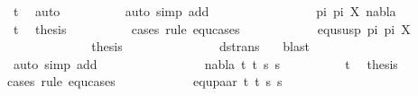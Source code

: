 \begin{isabellebody}
\ t{}{}\ \isamarkupfalse%
\ auto\isanewline
\ \ \ \ \ \ \ \ \isamarkupfalse%
\ {\isacharparenleft}{\kern0pt}auto\ simp\ add{\isacharcolon}{\kern0pt}\ {}{\isacharparenright}{\kern0pt}\isanewline
\ \ \ \ \ \isamarkupfalse%
\isanewline
\ \ \ \ \ \ \ \isamarkupfalse%
\ {\isacharparenleft}{\kern0pt}{}\ pi{}\ pi{}\ X\ nabla{\isacharparenright}{\kern0pt}\isanewline
\ \ \ \ \ \ \ \ \isamarkupfalse%
\ t{}{}\ \isamarkupfalse%
\ {\isacharquery}{\kern0pt}thesis\ \isanewline
\ \ \ \ \ \ \ \ \isamarkupfalse%
{\isacharparenleft}{\kern0pt}cases\ rule{\isacharcolon}{\kern0pt}\ equ{\isachardot}{\kern0pt}cases{\isacharparenright}{\kern0pt}\isanewline
\ \ \ \ \ \ \ \ \ \ \isamarkupfalse%
\ {\isacharparenleft}{\kern0pt}equ{\isacharunderscore}{\kern0pt}susp\ pi{}\ pi{}\ X{\isacharparenright}{\kern0pt}\isanewline
\ \ \ \ \ \ \ \ \ \ \isamarkupfalse%
\ \isamarkupfalse%
\ {\isacharquery}{\kern0pt}thesis\ \isanewline
\ \ \ \ \ \ \ \ \ \ \ \ \isamarkupfalse%
\ ds{\isacharunderscore}{\kern0pt}trans\ {}\ \isamarkupfalse%
\ blast\isanewline
\ \ \ \ \ \ \ \ \isamarkupfalse%
\ {\isacharparenleft}{\kern0pt}auto\ simp\ add{\isacharcolon}{\kern0pt}\ {}{\isacharparenright}{\kern0pt}\isanewline
\ \ \ \ \ \isamarkupfalse%
\isanewline
\ \ \ \ \ \ \ \isamarkupfalse%
\ {\isacharparenleft}{\kern0pt}{}\ nabla\ t{}{\isacharprime}{\kern0pt}\ t{}{\isacharprime}{\kern0pt}\ s{}{\isacharprime}{\kern0pt}\ s{}{\isacharprime}{\kern0pt}{\isacharparenright}{\kern0pt}\isanewline
\ \ \ \ \ \ \ \ \isamarkupfalse%
\ t{}{}\ \isamarkupfalse%
\ {\isacharquery}{\kern0pt}thesis\ \isanewline
\ \ \ \ \ \ \ \ \isamarkupfalse%
{\isacharparenleft}{\kern0pt}cases\ rule{\isacharcolon}{\kern0pt}\ equ{\isachardot}{\kern0pt}cases{\isacharparenright}{\kern0pt}\isanewline
\ \ \ \ \ \ \ \ \ \ \isamarkupfalse%
\ {\isacharparenleft}{\kern0pt}equ{\isacharunderscore}{\kern0pt}paar\ t{}{\isacharprime}{\kern0pt}\ t{}{\isacharprime}{\kern0pt}\ s{}{\isacharprime}{\kern0pt}\ s{}{\isacharprime}{\kern0pt}{\isacharparenright}{\kern0pt}\isanewline
\ \ \ \ \ \ \ \ \ \ \isamarkupfalse%

\end{isabellebody}
